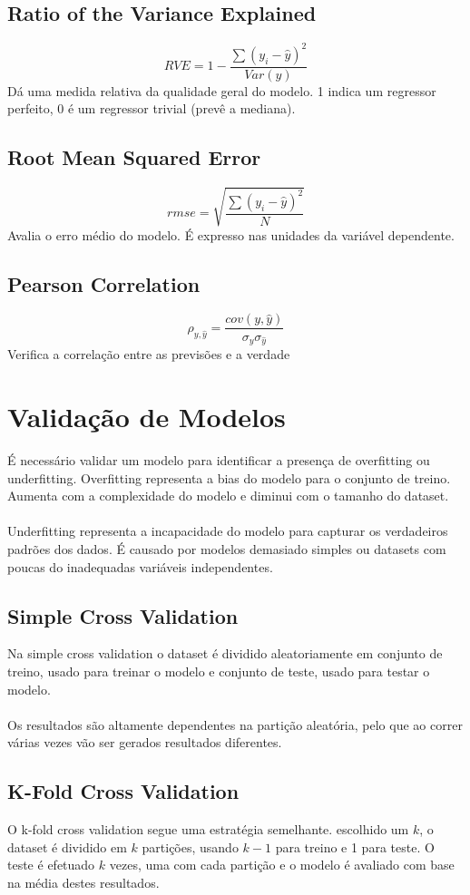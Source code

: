\documentclass[10pt,a4paper]{report}
\begin{document}
\subsection{Ratio of the Variance Explained}
$$
RVE = 1 - \frac{\sum (y_i - \hat{y})^2}{Var(y)}
$$
Dá uma medida relativa da qualidade geral do modelo. 1 indica um regressor perfeito, 0 é um regressor trivial (prevê a mediana).
\subsection{Root Mean Squared Error}
$$
rmse = \sqrt{\frac{\sum (y_i - \hat{y})^2}{N}}
$$
Avalia o erro médio do modelo. É expresso nas unidades da variável dependente.
\subsection{Pearson Correlation}
$$
\rho_{y, \hat{y}} = \frac{cov(y, \hat{y})}{\sigma_y\sigma_{\hat{y}}}
$$
Verifica a correlação entre as previsões e a verdade
\section{Validação de Modelos}
É necessário validar um modelo para identificar a presença de overfitting ou underfitting.
Overfitting representa a bias do modelo para o conjunto de treino. Aumenta com a complexidade do modelo e diminui com o tamanho do dataset.\\
\\
Underfitting representa a incapacidade do modelo para capturar os verdadeiros padrões dos dados. É causado por modelos demasiado simples ou datasets com poucas do inadequadas variáveis independentes.
\subsection{Simple Cross Validation}
Na simple cross validation o dataset é dividido aleatoriamente em conjunto de treino, usado para treinar o modelo e conjunto de teste, usado para testar o modelo. \\
\\
Os resultados são altamente dependentes na partição aleatória, pelo que ao correr várias vezes vão ser gerados resultados diferentes.
\subsection{K-Fold Cross Validation}
O k-fold cross validation segue uma estratégia semelhante. escolhido um $k$, o dataset é dividido em $k$ partições, usando $k - 1$ para treino e 1 para teste. O teste é efetuado $k$ vezes, uma com cada partição e o modelo é avaliado com base na média destes resultados.
\end{document}
